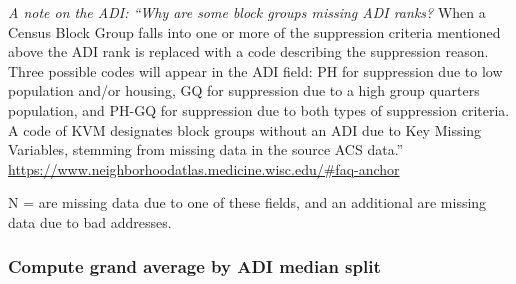 \documentclass[
]{article}
\begin{document}
\emph{A note on the ADI: ``Why are some block groups missing ADI ranks?}
When a Census Block Group falls into one or more of the suppression
criteria mentioned above the ADI rank is replaced with a code describing
the suppression reason. Three possible codes will appear in the ADI
field: PH for suppression due to low population and/or housing, GQ for
suppression due to a high group quarters population, and PH-GQ for
suppression due to both types of suppression criteria. A code of KVM
designates block groups without an ADI due to Key Missing Variables,
stemming from missing data in the source ACS data.''
\url{https://www.neighborhoodatlas.medicine.wisc.edu/\#faq-anchor}

N = are missing data due to one of these fields, and an additional are
missing data due to bad addresses.

\hypertarget{compute-grand-average-by-adi-median-split}{%
\subsubsection{Compute grand average by ADI median
split}\label{compute-grand-average-by-adi-median-split}}
\end{document}
